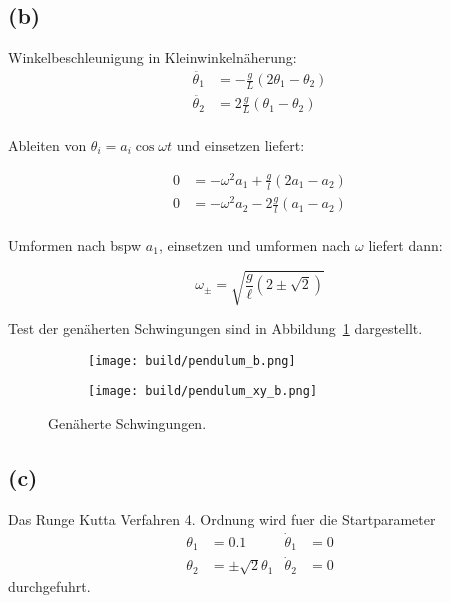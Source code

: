 \documentclass{scrartcl}
\begin{document}
\subsection*{(b)}
Winkelbeschleunigung in Kleinwinkelnäherung:
\begin{align*}
	\ddot{\theta_1} &= -\frac{g}{L} \left(2 \theta_1 - \theta_2 \right) \\
	\ddot{\theta_2} &= 2 \frac{g}{L} \left( \theta_1 - \theta_2 \right) \\
\end{align*}

Ableiten von $\theta_i = a_i \cos{\omega t}$ und einsetzen liefert:

\begin{align*}
	0 &= - \omega^2 a_1 + \frac g l \left( 2 a_1-a_2\right)  \\
	0 &= - \omega^2 a_2 - 2 \frac g l \left(a_1-a_2\right)  \\
\end{align*}

Umformen nach bspw $a_1$, einsetzen und umformen nach $\omega$ liefert dann:

\begin{equation*}
	 \omega _ { \pm } = \sqrt { \frac { g } { \ell } ( 2 \pm \sqrt { 2 } ) }
\end{equation*}

Test der genäherten Schwingungen sind in Abbildung~\ref{fig:b1} dargestellt.
\begin{figure}[ht]
  \centering
  \begin{subfigure}{0.8\textwidth}
    \centering
    \texttt{[image: build/pendulum\_b.png]}
  \end{subfigure}

  \begin{subfigure}{0.8\textwidth}
    \centering
    \texttt{[image: build/pendulum\_xy\_b.png]}
  \end{subfigure}
  \caption{Genäherte Schwingungen.}
  \label{fig:b1}
\end{figure}

\subsection*{(c)}
Das Runge Kutta Verfahren 4. Ordnung wird fuer die Startparameter
\begin{align*}
  \theta_1 &= 0.1  & \dot\theta_1 &= 0 \\
  \theta_2 &= \pm \sqrt{2} \theta_1  & \dot\theta_2 &= 0
\end{align*}
durchgefuhrt.
\end{document}
